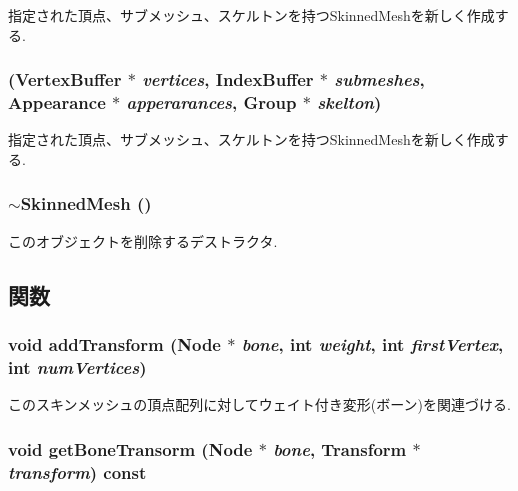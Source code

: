 指定された頂点、サブメッシュ、スケルトンを持つSkinnedMeshを新しく作成する. \hypertarget{classm3g_1_1SkinnedMesh_145692b6dfd3581aae05ef8f5db20a99}{
\subsubsection[{SkinnedMesh}]{ ({\bf VertexBuffer} $\ast$ {\em vertices}, \/  {\bf IndexBuffer} $\ast$ {\em submeshes}, \/  {\bf Appearance} $\ast$ {\em apperarances}, \/  {\bf Group} $\ast$ {\em skelton})}}
\label{classm3g_1_1SkinnedMesh_145692b6dfd3581aae05ef8f5db20a99}


指定された頂点、サブメッシュ、スケルトンを持つSkinnedMeshを新しく作成する. \hypertarget{classm3g_1_1SkinnedMesh_c73da5b5c5f8f14fc241328b4b78928c}{
\subsubsection[{$\sim$SkinnedMesh}]{\setlength{\rightskip}{0pt plus 5cm}$\sim${\bf SkinnedMesh} ()}}
\label{classm3g_1_1SkinnedMesh_c73da5b5c5f8f14fc241328b4b78928c}


このオブジェクトを削除するデストラクタ. 

\subsection{関数}
\hypertarget{classm3g_1_1SkinnedMesh_4b6fd5f52884251fdda11ad4a40d41d4}{
\subsubsection[{addTransform}]{\setlength{\rightskip}{0pt plus 5cm}void addTransform ({\bf Node} $\ast$ {\em bone}, \/  int {\em weight}, \/  int {\em firstVertex}, \/  int {\em numVertices})}}
\label{classm3g_1_1SkinnedMesh_4b6fd5f52884251fdda11ad4a40d41d4}


このスキンメッシュの頂点配列に対してウェイト付き変形(ボーン)を関連づける. \hypertarget{classm3g_1_1SkinnedMesh_b0023a2cdce8d562a4988024e8644a13}{
\subsubsection[{getBoneTransorm}]{\setlength{\rightskip}{0pt plus 5cm}void getBoneTransorm ({\bf Node} $\ast$ {\em bone}, \/  {\bf Transform} $\ast$ {\em transform}) const}}
\label{classm3g_1_1SkinnedMesh_b0023a2cdce8d562a4988024e8644a13}


